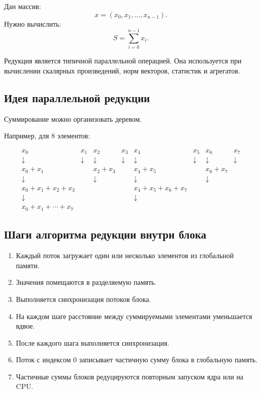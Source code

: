 \documentclass[12pt,a4paper]{article}
\begin{document}
Дан массив:
\[
    x = (x_0,x_1,\dots,x_{n-1}).
\]
Нужно вычислить:
\[
    S = \sum_{i=0}^{n-1} x_i.
\]

Редукция является типичной параллельной операцией. Она используется при вычислении скалярных произведений, норм векторов, статистик и агрегатов.

\subsection{Идея параллельной редукции}

Суммирование можно организовать деревом.

Например, для $8$ элементов:

\[
\begin{array}{cccccccc}
x_0 & x_1 & x_2 & x_3 & x_4 & x_5 & x_6 & x_7 \\
\downarrow & \downarrow & \downarrow & \downarrow & \downarrow & \downarrow & \downarrow & \downarrow \\
x_0+x_1 & & x_2+x_3 & & x_4+x_5 & & x_6+x_7 & \\
\downarrow & & \downarrow & & \downarrow & & \downarrow & \\
x_0+x_1+x_2+x_3 & & & & x_4+x_5+x_6+x_7 & & & \\
\downarrow & & & & \downarrow & & & \\
x_0+x_1+\cdots+x_7 & & & & & & &
\end{array}
\]

\subsection{Шаги алгоритма редукции внутри блока}

\begin{enumerate}
    \item Каждый поток загружает один или несколько элементов из глобальной памяти.
    \item Значения помещаются в разделяемую память.
    \item Выполняется синхронизация потоков блока.
    \item На каждом шаге расстояние между суммируемыми элементами уменьшается вдвое.
    \item После каждого шага выполняется синхронизация.
    \item Поток с индексом $0$ записывает частичную сумму блока в глобальную память.
    \item Частичные суммы блоков редуцируются повторным запуском ядра или на CPU.
\end{enumerate}
\end{document}
